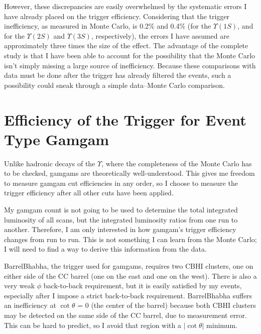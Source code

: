 However, these discrepancies are easily overwhelmed by the systematic
errors I have already placed on the trigger efficiency.  Considering
that the trigger inefficiency, as measured in Monte Carlo, is 0.2\%
and 0.4\% (for the $\Upsilon(1S)$, and for the $\Upsilon(2S)$ and
$\Upsilon(3S)$, respectively), the errors I have assumed are
approximately three times the size of the effect.  The advantage of
the complete study is that I have been able to account for the
possibility that the Monte Carlo isn't simply missing a large source
of inefficiency.  Because these comparisons with data must be done
after the trigger has already filtered the events, such a possibility
could sneak through a simple data--Monte Carlo comparison.

\section{Efficiency of the Trigger for Event Type Gamgam}

Unlike hadronic decays of the $\Upsilon$, where the completeness of
the Monte Carlo has to be checked, gamgams are theoretically
well-understood.  This gives me freedom to measure gamgam cut
efficiencies in any order, so I choose to measure the trigger
efficiency after all other cuts have been applied.

My gamgam count is not going to be used to determine the total
integrated luminosity of all scans, but the integrated luminosity
ratios from one run to another.  Therefore, I am only interested in
how gamgam's trigger efficiency changes from run to run.  This is not
something I can learn from the Monte Carlo; I will need to find a way
to derive this information from the data.

BarrelBhabha, the trigger used for gamgams, requires two CBHI
clusters, one on either side of the CC barrel (one on the east and one
on the west).  There is also a very weak $\phi$ back-to-back
requirement, but it is easily satisfied by my events, especially after
I impose a strict back-to-back requirement.  BarrelBhabha suffers an
inefficiency at $\cot\theta$ = 0 (the center of the barrel) because
both CBHI clusters may be detected on the same side of the CC barrel,
due to measurement error.  This can be hard to predict, so I avoid
that region with a $|\cot\theta|$ minimum.


